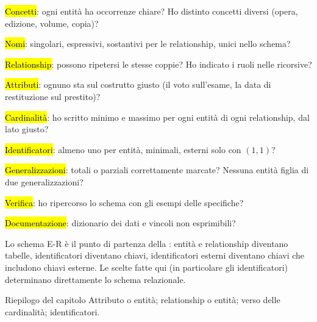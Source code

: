 \begin{passi}
  \item \hl{Concetti}: ogni entità ha occorrenze chiare? Ho distinto concetti diversi (opera, edizione, volume, copia)?
  \item \hl{Nomi}: singolari, espressivi, sostantivi per le relationship, unici nello schema?
  \item \hl{Relationship}: possono ripetersi le stesse coppie? Ho indicato i ruoli nelle ricorsive?
  \item \hl{Attributi}: ognuno sta sul costrutto giusto (il voto sull'esame, la data di restituzione sul prestito)?
  \item \hl{Cardinalità}: ho scritto minimo e massimo per ogni entità di ogni relationship, dal lato giusto?
  \item \hl{Identificatori}: almeno uno per entità, minimali, esterni solo con $(1,1)$?
  \item \hl{Generalizzazioni}: totali o parziali correttamente marcate? Nessuna entità figlia di due generalizzazioni?
  \item \hl{Verifica}: ho ripercorso lo schema con gli esempi delle specifiche?
  \item \hl{Documentazione}: dizionario dei dati e vincoli non esprimibili?
\end{passi}

\begin{mlbox}
Lo schema E-R è il punto di partenza della : entità e relationship diventano tabelle, identificatori diventano chiavi, identificatori esterni diventano chiavi che includono chiavi esterne. Le scelte fatte qui (in particolare gli identificatori) determinano direttamente lo schema relazionale.
\end{mlbox}

\begin{appunti}{Riepilogo del capitolo}
 Attributo o entità; relationship o entità; verso delle cardinalità; identificatori.
\end{appunti}
